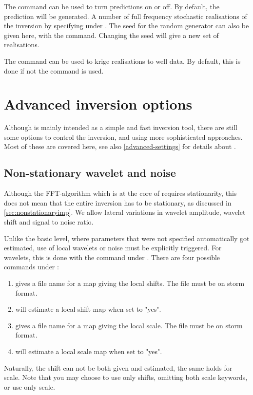 The command  can be used to turn predictions on or off. By default, the prediction will be generated. A number of full frequency stochastic realisations of the inversion by specifying  under . The seed for the random generator can also be given here, with the  command. Changing the seed will give a new set of realisations.

The command  can be used to krige realisations to well data. By default, this is done if not the  command is used.

\section{Advanced inversion options}
\label{sec:advinvusr}
Although \crava is mainly intended as a simple and fast inversion tool, there are still some options to control the inversion, and using more sophisticated approaches. Most of these are covered here, see also \autoref{advanced-settings} for details about .
\subsection{Non-stationary wavelet and noise}
Although the FFT-algorithm which is at the core of \crava requires
stationarity, this does not mean that the entire inversion has to be
stationary, as discussed in \autoref{sec:nonstationaryimp}. We allow
lateral variations in wavelet amplitude, wavelet shift and signal to
noise ratio. 

Unlike the basic level, where parameters that were not specified
automatically got estimated, use of local wavelets or noise must be
explicitly triggered. For wavelets, this is done with the
 command under
. There are four possible commands under
: 
\begin{enumerate}
\item {} gives a file name for a map giving the local shifts. The file must be on storm format.
\item {} will estimate a local shift map when set to "yes".
\item {} gives a file name for a map giving the local scale. The file must be on storm format.
\item {} will estimate a local scale map when set to "yes".
\end{enumerate}
Naturally, the shift can not be both given and estimated, the same
holds for scale. Note that you may choose to use only shifts, omitting
both scale keywords, or use only scale. 

